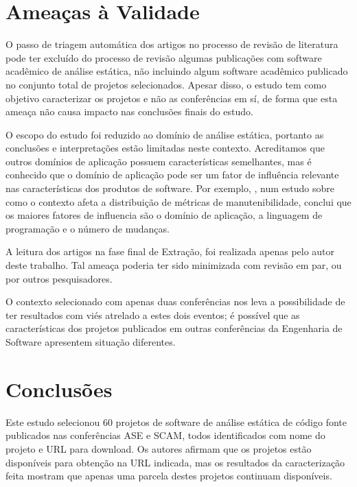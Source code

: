
\section{Ameaças à Validade} %

O passo de triagem automática dos artigos no processo de revisão de literatura
pode ter excluído do processo de revisão algumas publicações com software
acadêmico de análise estática, 
não incluindo algum software acadêmico publicado no conjunto total de projetos
selecionados. Apesar disso, o estudo tem como objetivo
caracterizar os projetos e não as conferências em sí, de forma que esta ameaça
não causa impacto nas conclusões finais do estudo.

O escopo do estudo foi reduzido ao domínio de análise estática, portanto as
conclusões e interpretações estão limitadas neste contexto. Acreditamos que
outros domínios de aplicação possuem características semelhantes, mas é
conhecido que o domínio de aplicação pode ser um fator de influência relevante nas
características dos produtos de software.
Por exemplo, , num estudo sobre como o contexto afeta
a distribuição de métricas de manutenibilidade, conclui que os maiores fatores
de influencia são o domínio de aplicação, a linguagem de programação e o número
de mudanças.

A leitura dos artigos na fase final de Extração, foi realizada
apenas pelo autor deste trabalho. Tal ameaça poderia ter sido minimizada com
revisão em par, ou por outros pesquisadores.

O contexto selecionado com apenas duas conferências nos leva a possibilidade de
ter resultados com viés atrelado a estes dois eventos; é possível que as
características dos projetos publicados em outras conferências da Engenharia de
Software apresentem situação diferentes.


\section{Conclusões} \label{estudo1:conclusoes} %

Este estudo selecionou 60 projetos de software de análise estática de código
fonte publicados nas conferências ASE e SCAM, todos identificados com nome do
projeto e URL para download. Os autores afirmam que os projetos estão
disponíveis para obtenção na URL indicada, mas os resultados da caracterização
feita mostram que apenas uma parcela destes projetos continuam disponíveis.

